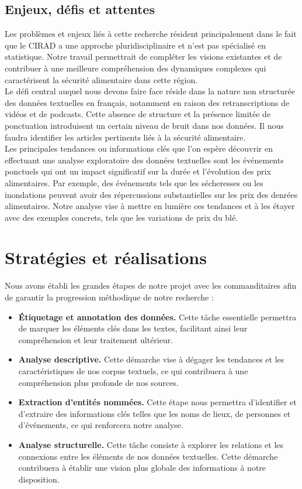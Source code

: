 \documentclass{article}
\begin{document}
\subsection{Enjeux, défis et attentes}
Les problèmes et enjeux liés à cette recherche résident principalement dans le fait que le CIRAD a une approche pluridisciplinaire et n'est pas spécialisé en statistique. Notre travail permettrait de compléter les visions existantes et de contribuer à une meilleure compréhension des dynamiques complexes qui caractérisent la sécurité alimentaire dans cette région.\\

Le défi central auquel nous devons faire face réside dans la nature non structurée des données textuelles en français, notamment en raison des retranscriptions de vidéos et de podcasts. Cette absence de structure et la présence limitée de ponctuation introduisent un certain niveau de bruit dans nos données. Il nous faudra identifier les articles pertinents liés à la sécurité alimentaire.\\

Les principales tendances ou informations clés que l'on espère découvrir en effectuant une analyse exploratoire des données textuelles sont les événements ponctuels qui ont un impact significatif sur la durée et l'évolution des prix alimentaires. Par exemple, des événements tels que les sécheresses ou les inondations peuvent avoir des répercussions substantielles sur les prix des denrées alimentaires. Notre analyse vise à mettre en lumière ces tendances et à les étayer avec des exemples concrets, tels que les variations de prix du blé.

\section{Stratégies et réalisations}
Nous avons établi les grandes étapes de notre projet avec les commanditaires afin de garantir la progression méthodique de notre recherche :
\begin{itemize}
    \item \textbf{Étiquetage et annotation des données.} Cette tâche essentielle permettra de marquer les éléments clés dans les textes, facilitant ainsi leur compréhension et leur traitement ultérieur.
    \item \textbf{Analyse descriptive.} Cette démarche vise à dégager les tendances et les caractéristiques de nos corpus textuels, ce qui contribuera à une compréhension plus profonde de nos sources.
    \item \textbf{Extraction d'entités nommées.} Cette étape nous permettra d'identifier et d'extraire des informations clés telles que les noms de lieux, de personnes et d'événements, ce qui renforcera notre analyse.
    \item \textbf{Analyse structurelle.} Cette tâche consiste à explorer les relations et les connexions entre les éléments de nos données textuelles. Cette démarche contribuera à établir une vision plus globale des informations à notre disposition.\\
\end{itemize}
\end{document}

